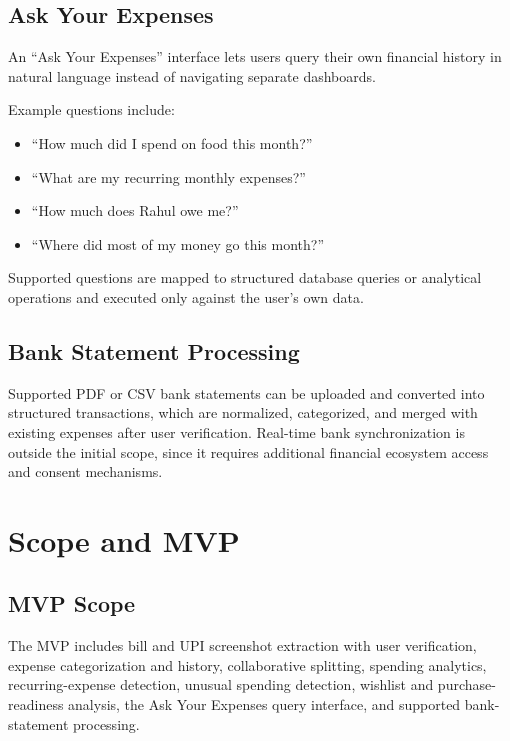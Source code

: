 \documentclass[11pt,a4paper]{article}
\begin{document}
\subsection{Ask Your Expenses}

An ``Ask Your Expenses'' interface lets users query their own financial
history in natural language instead of navigating separate dashboards.

Example questions include:

\begin{itemize}
    \item ``How much did I spend on food this month?''
    \item ``What are my recurring monthly expenses?''
    \item ``How much does Rahul owe me?''
    \item ``Where did most of my money go this month?''
\end{itemize}

Supported questions are mapped to structured database queries or
analytical operations and executed only against the user's own data.

\subsection{Bank Statement Processing}

Supported PDF or CSV bank statements can be uploaded and converted into
structured transactions, which are normalized, categorized, and merged
with existing expenses after user verification. Real-time bank
synchronization is outside the initial scope, since it requires
additional financial ecosystem access and consent mechanisms.


\section{Scope and MVP}

\subsection{MVP Scope}

The MVP includes bill and UPI screenshot extraction with user
verification, expense categorization and history, collaborative
splitting, spending analytics, recurring-expense detection, unusual
spending detection, wishlist and purchase-readiness analysis, the
Ask Your Expenses query interface, and supported bank-statement
processing.
\end{document}

